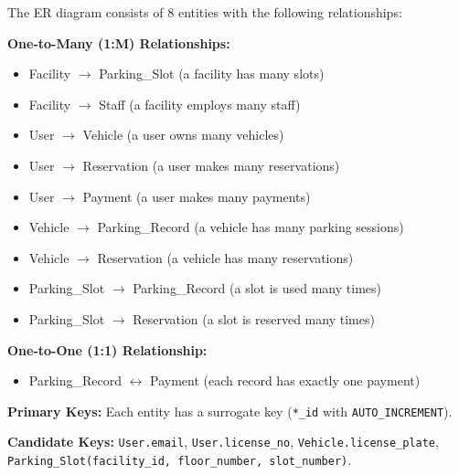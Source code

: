 \documentclass[12pt,a4paper]{article}
\begin{document}
\begin{questionbox}
\end{questionbox}
\begin{answerbox}
The ER diagram consists of 8 entities with the following relationships:

\textbf{One-to-Many (1:M) Relationships:}
\begin{itemize}[nosep]
    \item Facility $\rightarrow$ Parking\_Slot (a facility has many slots)
    \item Facility $\rightarrow$ Staff (a facility employs many staff)
    \item User $\rightarrow$ Vehicle (a user owns many vehicles)
    \item User $\rightarrow$ Reservation (a user makes many reservations)
    \item User $\rightarrow$ Payment (a user makes many payments)
    \item Vehicle $\rightarrow$ Parking\_Record (a vehicle has many parking sessions)
    \item Vehicle $\rightarrow$ Reservation (a vehicle has many reservations)
    \item Parking\_Slot $\rightarrow$ Parking\_Record (a slot is used many times)
    \item Parking\_Slot $\rightarrow$ Reservation (a slot is reserved many times)
\end{itemize}

\textbf{One-to-One (1:1) Relationship:}
\begin{itemize}[nosep]
    \item Parking\_Record $\leftrightarrow$ Payment (each record has exactly one payment)
\end{itemize}

\textbf{Primary Keys:} Each entity has a surrogate key (\texttt{*\_id} with \texttt{AUTO\_INCREMENT}).

\textbf{Candidate Keys:} \texttt{User.email}, \texttt{User.license\_no}, \texttt{Vehicle.license\_plate}, \texttt{Parking\_Slot(facility\_id, floor\_number, slot\_number)}.
\end{answerbox}
\end{document}
